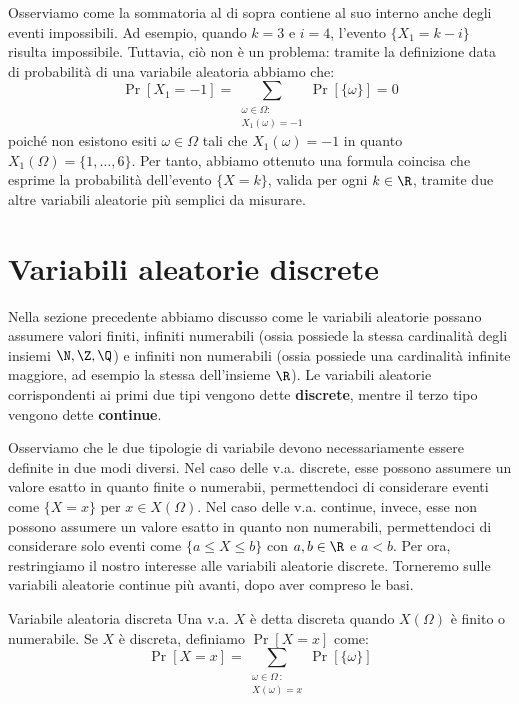 \documentclass[a4paper, 12pt]{report}
\begin{document}
    Osserviamo come la sommatoria al di sopra contiene al suo interno anche degli eventi impossibili. Ad esempio, quando $k = 3$ e $i = 4$, l'evento $\{X_1 = k-i\}$ risulta impossibile. Tuttavia, ciò non è un problema: tramite la definizione data di probabilità di una variabile aleatoria abbiamo che:
    \[\Pr[X_1 = -1] = \sum_{\substack{\omega \in \Omega :\\ X_1(\omega) = -1}} \Pr[\{\omega\}] = 0\]
    poiché non esistono esiti $\omega \in \Omega$ tali che $X_1(\omega) = -1$ in quanto $X_1(\Omega) = \{1, \ldots, 6\}$. Per tanto, abbiamo ottenuto una formula coincisa che esprime la probabilità dell'evento $\{X = k\}$, valida per ogni $k \in \R$, tramite due altre variabili aleatorie più semplici da misurare.

    \section{Variabili aleatorie discrete}

    \label{val_disc}

    Nella sezione precedente abbiamo discusso come le variabili aleatorie possano assumere valori finiti, infiniti numerabili (ossia possiede la stessa cardinalità degli insiemi $\N, \Z, \Q$) e infiniti non numerabili (ossia possiede una cardinalità infinite maggiore, ad esempio la stessa dell'insieme $\R$). Le variabili aleatorie corrispondenti ai primi due tipi vengono dette \textbf{discrete}, mentre il terzo tipo vengono dette \textbf{continue}.

    Osserviamo che le due tipologie di variabile devono necessariamente essere definite in due modi diversi. Nel caso delle v.a. discrete, esse possono assumere un valore esatto in quanto finite o numerabii, permettendoci di considerare eventi come $\{X = x\}$ per $x \in X(\Omega)$. Nel caso delle v.a. continue, invece, esse non possono assumere un valore esatto in quanto non numerabili, permettendoci di considerare solo eventi come $\{a \leq X \leq b\}$ con $a,b \in \R$ e $a<b$. Per ora, restringiamo il nostro interesse alle variabili aleatorie discrete. Torneremo sulle variabili aleatorie continue più avanti, dopo aver compreso le basi.

    \begin{frameddefn}{Variabile aleatoria discreta}
        Una v.a. $X$ è detta discreta quando $X(\Omega)$ è finito o numerabile. Se $X$ è discreta, definiamo $\Pr[X = x]$ come:
        \[\Pr[X = x] = \sum_{\substack{\omega \in \Omega \,:\\X(\omega) = x}} \Pr[\{\omega\}]\]
    \end{frameddefn}
\end{document}
